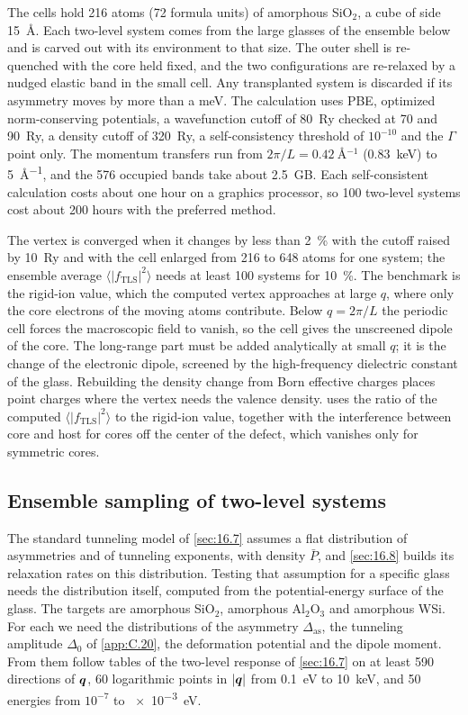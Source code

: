 The cells hold 216 atoms (72 formula units) of amorphous SiO$_2$, a cube of side \SI{15}{\angstrom}. Each two-level system comes from the large glasses of the ensemble below and is carved out with its environment to that size. The outer shell is re-quenched with the core held fixed, and the two configurations are re-relaxed by a nudged elastic band in the small cell. Any transplanted system is discarded if its asymmetry moves by more than a meV. The calculation uses PBE, optimized norm-conserving potentials, a wavefunction cutoff of \SI{80}{Ry} checked at 70 and \SI{90}{Ry}, a density cutoff of \SI{320}{Ry}, a self-consistency threshold of $10^{-10}$ and the $\Gamma$ point only. The momentum transfers run from $2\pi/L = \SI{0.42}{\angstrom^{-1}}$ (\SI{0.83}{keV}) to \SI{5}{\angstrom^{-1}}, and the 576 occupied bands take about \SI{2.5}{GB}. Each self-consistent calculation costs about one hour on a graphics processor, so 100 two-level systems cost about 200 hours with the preferred method.

The vertex is converged when it changes by less than \SI{2}{\percent} with the cutoff raised by \SI{10}{Ry} and with the cell enlarged from 216 to 648 atoms for one system; the ensemble average $\langle|f_{\mathrm{TLS}}|^2\rangle$ needs at least 100 systems for \SI{10}{\percent}. The benchmark is the rigid-ion value, which the computed vertex approaches at large $q$, where only the core electrons of the moving atoms contribute. Below $q = 2\pi/L$ the periodic cell forces the macroscopic field to vanish, so the cell gives the unscreened dipole of the core. The long-range part must be added analytically at small $q$; it is the change of the electronic dipole, screened by the high-frequency dielectric constant of the glass. Rebuilding the density change from Born effective charges places point charges where the vertex needs the valence density.  uses the ratio of the computed $\langle|f_{\mathrm{TLS}}|^2\rangle$ to the rigid-ion value, together with the interference between core and host for cores off the center of the defect, which vanishes only for symmetric cores.

\subsection{Ensemble sampling of two-level systems}

The standard tunneling model of \cref{sec:16.7} assumes a flat distribution of asymmetries and of tunneling exponents, with density $\bar P$, and \cref{sec:16.8} builds its relaxation rates on this distribution. Testing that assumption for a specific glass needs the distribution itself, computed from the potential-energy surface of the glass. The targets are amorphous SiO$_2$, amorphous Al$_2$O$_3$ and amorphous WSi. For each we need the distributions of the asymmetry $\Delta_{\mathrm{as}}$, the tunneling amplitude $\Delta_0$ of \cref{app:C.20}, the deformation potential and the dipole moment. From them follow tables of the two-level response of \cref{sec:16.7} on at least 590 directions of $\bm{q}$, 60 logarithmic points in $|\bm{q}|$ from \SI{0.1}{eV} to \SI{10}{keV}, and 50 energies from $10^{-7}$ to \SI{e-3}{eV}.

